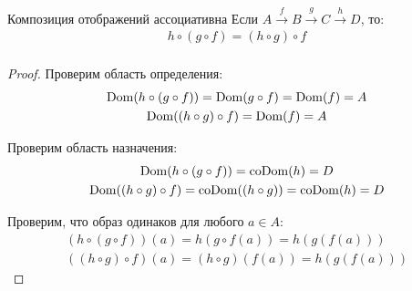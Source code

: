 \begin{theorem}{Композиция отображений ассоциативна}
Если $A \xrightarrow{f} B \xrightarrow{g} C \xrightarrow{h} D$, то:
\begin{gather*}
h \circ (g \circ f) = (h \circ g) \circ f \\
\end{gather*}
\end{theorem}

\begin{proof}
Проверим область определения:
\begin{gather*}
\operatorname{Dom}(h \circ (g \circ f)) = \operatorname{Dom}(g \circ f) = \operatorname{Dom}(f) = A \\
\operatorname{Dom}((h \circ g) \circ f) = \operatorname{Dom}(f) = A
\end{gather*}

Проверим область назначения:
\begin{gather*}
\operatorname{Dom}(h \circ (g \circ f)) = \operatorname{coDom}(h) = D \\
\operatorname{Dom}((h \circ g) \circ f) = \operatorname{coDom}((h \circ g)) = \operatorname{coDom}(h) = D
\end{gather*}

Проверим, что образ одинаков для любого $a \in A$:
\begin{gather*}
(h \circ (g \circ f))(a) = h(g \circ f(a)) = h(g(f(a))) \\
((h \circ g) \circ f)(a) = (h \circ g)(f(a)) = h(g(f(a)))
\end{gather*}

\end{proof}
